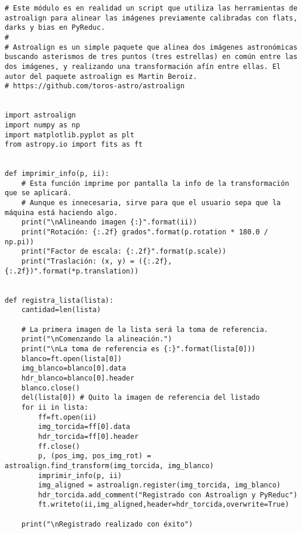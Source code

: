 \begin{lstlisting}[style=python]
# Este módulo es en realidad un script que utiliza las herramientas de astroalign para alinear las imágenes previamente calibradas con flats, darks y bias en PyReduc.
#
# Astroalign es un simple paquete que alinea dos imágenes astronómicas buscando asterismos de tres puntos (tres estrellas) en común entre las dos imágenes, y realizando una transformación afín entre ellas. El autor del paquete astroalign es Martin Beroiz.
# https://github.com/toros-astro/astroalign


import astroalign
import numpy as np
import matplotlib.pyplot as plt
from astropy.io import fits as ft


def imprimir_info(p, ii):
    # Esta función imprime por pantalla la info de la transformación que se aplicará.
    # Aunque es innecesaria, sirve para que el usuario sepa que la máquina está haciendo algo.
    print("\nAlineando imagen {:}".format(ii))
    print("Rotación: {:.2f} grados".format(p.rotation * 180.0 / np.pi))
    print("Factor de escala: {:.2f}".format(p.scale))
    print("Traslación: (x, y) = ({:.2f}, {:.2f})".format(*p.translation))


def registra_lista(lista):
    cantidad=len(lista)
    
    # La primera imagen de la lista será la toma de referencia.
    print("\nComenzando la alineación.")
    print("\nLa toma de referencia es {:}".format(lista[0])) 
    blanco=ft.open(lista[0])
    img_blanco=blanco[0].data
    hdr_blanco=blanco[0].header
    blanco.close()
    del(lista[0]) # Quito la imagen de referencia del listado
    for ii in lista:
        ff=ft.open(ii)
        img_torcida=ff[0].data
        hdr_torcida=ff[0].header
        ff.close()
        p, (pos_img, pos_img_rot) = astroalign.find_transform(img_torcida, img_blanco)
        imprimir_info(p, ii)
        img_aligned = astroalign.register(img_torcida, img_blanco)
        hdr_torcida.add_comment("Registrado con Astroalign y PyReduc")
        ft.writeto(ii,img_aligned,header=hdr_torcida,overwrite=True)

    print("\nRegistrado realizado con éxito")
\end{lstlisting}